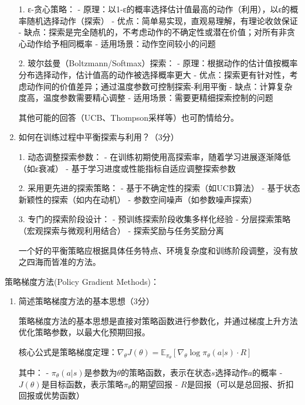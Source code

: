 \documentclass[zihao=5,answers]{BHCexam}
\begin{document}
\begin{questions}
\begin{solution}
\begin{enumerate}
    1. ε-贪心策略：
       - 原理：以1-ε的概率选择估计值最高的动作（利用），以ε的概率随机选择动作（探索）
       - 优点：简单易实现，直观易理解，有理论收敛保证
       - 缺点：探索是完全随机的，不考虑动作的不确定性或潜在价值；对所有非贪心动作给予相同概率
       - 适用场景：动作空间较小的问题
    
    2. 玻尔兹曼（Boltzmann/Softmax）探索：
       - 原理：根据动作的估计值按概率分布选择动作，估计值高的动作被选择概率更大
       - 优点：探索更有针对性，考虑动作间的价值差异；通过温度参数可控制探索-利用平衡
       - 缺点：计算复杂度高，温度参数需要精心调整
       - 适用场景：需要更精细探索控制的问题
    
    其他可能的回答（UCB、Thompson采样等）也可酌情给分。
    
    \item 如何在训练过程中平衡探索与利用？（3分）
    
    1. 动态调整探索参数：
       - 在训练初期使用高探索率，随着学习进展逐渐降低（如ε衰减）
       - 基于学习进度或性能指标自适应调整探索参数
    
    2. 采用更先进的探索策略：
       - 基于不确定性的探索（如UCB算法）
       - 基于状态新颖性的探索（如内在动机）
       - 参数空间噪声（如参数噪声探索）
    
    3. 专门的探索阶段设计：
       - 预训练探索阶段收集多样化经验
       - 分层探索策略（宏观探索与微观利用结合）
       - 探索奖励与任务奖励分离
    
    一个好的平衡策略应根据具体任务特点、环境复杂度和训练阶段调整，没有放之四海而皆准的方法。
\end{enumerate}
\end{solution}

\question[10] 策略梯度方法(Policy Gradient Methods)：
\begin{solution}
\begin{enumerate}
    \item 简述策略梯度方法的基本思想（3分）
    
    策略梯度方法的基本思想是直接对策略函数进行参数化，并通过梯度上升方法优化策略参数，以最大化预期回报。
    
    核心公式是策略梯度定理：$\nabla_\theta J(\theta) = \mathbb{E}_{\pi_\theta} [\nabla_\theta \log \pi_\theta(a|s) \cdot R]$
    
    其中：
    - $\pi_\theta(a|s)$是参数为$\theta$的策略函数，表示在状态$s$选择动作$a$的概率
    - $J(\theta)$是目标函数，表示策略$\pi_\theta$的期望回报
    - $R$是回报（可以是总回报、折扣回报或优势函数）
    

\end{enumerate}
\end{solution}
\end{questions}
\end{document}
